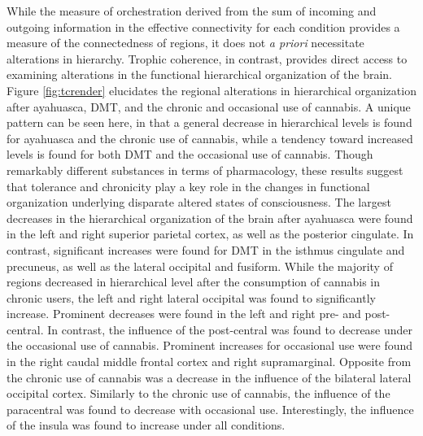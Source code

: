 While the measure of orchestration derived from the sum of incoming and
outgoing information in the effective connectivity for each condition
provides a measure of the connectedness of regions, it does not \emph{a
priori} necessitate alterations in hierarchy. Trophic coherence, in
contrast, provides direct access to examining alterations in the
functional hierarchical organization of the brain. Figure \ref{fig:tcrender} elucidates
the regional alterations in hierarchical organization after ayahuasca,
DMT, and the chronic and occasional use of cannabis. A unique pattern
can be seen here, in that a general decrease in hierarchical levels is
found for ayahuasca and the chronic use of cannabis, while a tendency
toward increased levels is found for both DMT and the occasional use of
cannabis. Though remarkably different substances in terms of
pharmacology, these results suggest that tolerance and chronicity play a
key role in the changes in functional organization underlying disparate
altered states of consciousness. The largest decreases in the
hierarchical organization of the brain after ayahuasca were found in the
left and right superior parietal cortex, as well as the posterior
cingulate. In contrast, significant increases were found for DMT in the
isthmus cingulate and precuneus, as well as the lateral occipital and
fusiform. While the majority of regions decreased in hierarchical level
after the consumption of cannabis in chronic users, the left and right
lateral occipital was found to significantly increase. Prominent
decreases were found in the left and right pre- and post-central. In
contrast, the influence of the post-central was found to decrease under
the occasional use of cannabis. Prominent increases for occasional use
were found in the right caudal middle frontal cortex and right
supramarginal. Opposite from the chronic use of cannabis was a decrease
in the influence of the bilateral lateral occipital cortex. Similarly to
the chronic use of cannabis, the influence of the paracentral was found
to decrease with occasional use. Interestingly, the influence of the
insula was found to increase under all conditions.

